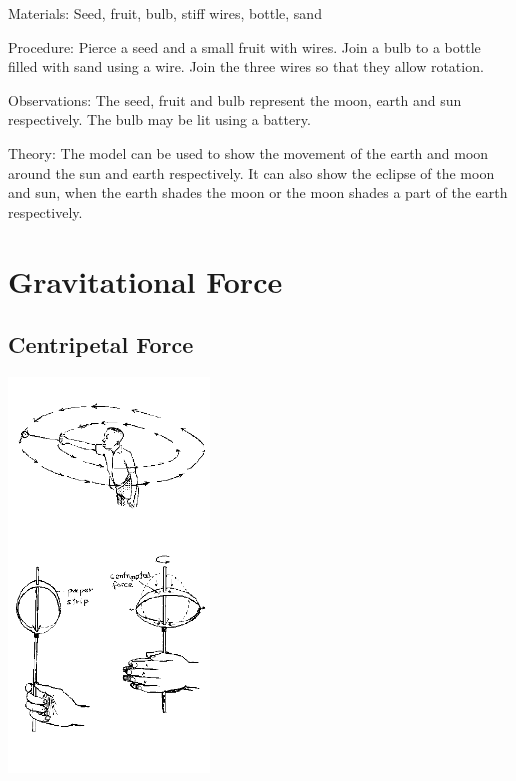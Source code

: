 \begin{multicols}{2}
\begin{description*}
\item[Materials:]{Seed, fruit, bulb, stiff wires, bottle, sand}
\item[Procedure:]{Pierce a seed and a small fruit with wires. Join a bulb to a bottle filled with sand using a wire. Join the three wires so that they allow rotation.}
\item[Observations:]{The seed, fruit and bulb represent the moon, earth and sun respectively. The bulb may be lit using a battery.}
\item[Theory:]{The model can be used to show the movement of the earth and moon around the sun and earth respectively. It can also show the eclipse of the moon and sun, when the earth shades the moon or the moon shades a part of the earth respectively.}
\end{description*}


\section*{Gravitational Force}


\subsection{Centripetal Force}

\begin{center}
\includegraphics[width=0.4\textwidth]{./img/source/centripetal-force.png}
\end{center}


\end{multicols}
